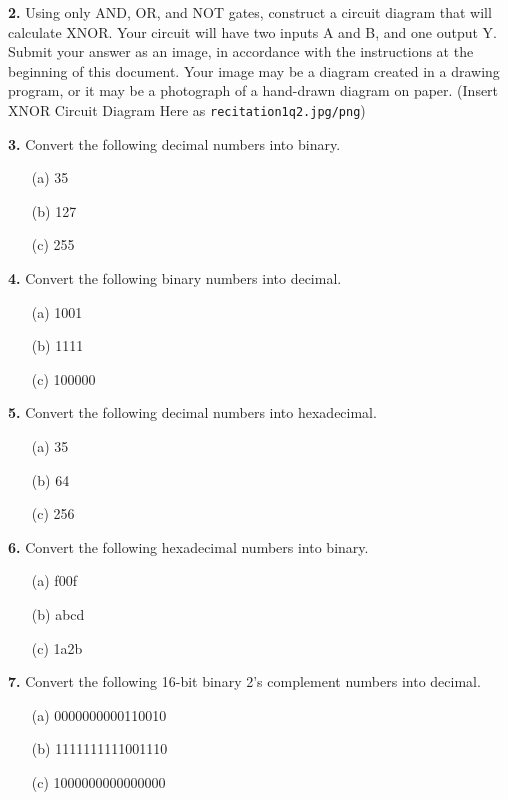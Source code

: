 \documentclass{article}
\begin{document}
\vspace{0.5cm}
\noindent\textbf{2.} Using only AND, OR, and NOT gates, construct a circuit diagram that will calculate XNOR. Your circuit will have two inputs A and B, and one output Y. Submit your answer as an image, in accordance with the instructions at the beginning of this document. Your image may be a diagram created in a drawing program, or it may be a photograph of a hand-drawn diagram on paper. (Insert XNOR Circuit Diagram Here as \texttt{recitation1q2.jpg/png})

\vspace{0.5cm}
\noindent\textbf{3.} Convert the following decimal numbers into binary.
\begin{enumerate}
    \item[(a)] 35
    \item[(b)] 127
    \item[(c)] 255
\end{enumerate}

\vspace{0.5cm}
\noindent\textbf{4.} Convert the following binary numbers into decimal.
\begin{enumerate}
    \item[(a)] 1001
    \item[(b)] 1111
    \item[(c)] 100000
\end{enumerate}

\vspace{0.5cm}
\noindent\textbf{5.} Convert the following decimal numbers into hexadecimal.
\begin{enumerate}
    \item[(a)] 35
    \item[(b)] 64
    \item[(c)] 256
\end{enumerate}

\vspace{0.5cm}
\noindent\textbf{6.} Convert the following hexadecimal numbers into binary.
\begin{enumerate}
    \item[(a)] f00f
    \item[(b)] abcd
    \item[(c)] 1a2b
\end{enumerate}

\vspace{0.5cm}
\noindent\textbf{7.}  Convert the following 16-bit binary 2’s complement numbers into decimal.
\begin{enumerate}
    \item[(a)] 0000000000110010
    \item[(b)] 1111111111001110
    \item[(c)] 1000000000000000
\end{enumerate}
\end{document}
